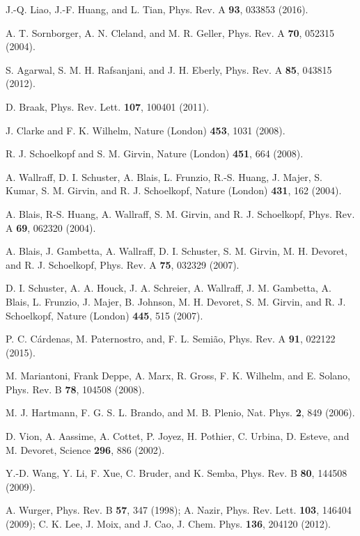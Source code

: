 \documentclass[%
reprint,
amsmath,amssymb,
aps,
pra,
]{revtex4-1}
\begin{document}
\begin{thebibliography}{99}
 J.-Q. Liao, J.-F. Huang, and L. Tian, Phys. Rev. A \textbf{93}, 033853 (2016).

 A. T. Sornborger, A. N. Cleland, and M. R. Geller, Phys. Rev. A \textbf{70}, 052315 (2004).

 S. Agarwal, S. M. H. Rafsanjani, and J. H. Eberly, Phys. Rev. A \textbf{85}, 043815 (2012).

 D. Braak, Phys. Rev. Lett. \textbf{107}, 100401 (2011).

 J. Clarke and F. K. Wilhelm, Nature (London) \textbf{453}, 1031 (2008).

 R. J. Schoelkopf and S. M. Girvin, Nature (London) \textbf{451}, 664 (2008).

 A. Wallraff, D. I. Schuster, A. Blais, L. Frunzio, R.-S. Huang, J. Majer, S. Kumar, S. M. Girvin, and R. J. Schoelkopf, Nature (London) \textbf{431}, 162 (2004).

 A. Blais, R-S. Huang, A. Wallraff, S. M. Girvin, and R. J. Schoelkopf, Phys. Rev. A \textbf{69}, 062320 (2004).

 A. Blais, J. Gambetta, A. Wallraff, D. I. Schuster, S. M. Girvin, M. H. Devoret, and R. J. Schoelkopf, Phys. Rev. A \textbf{75}, 032329 (2007).

 D. I. Schuster, A. A. Houck, J. A. Schreier, A. Wallraff, J. M. Gambetta, A. Blais, L. Frunzio, J. Majer, B. Johnson, M. H. Devoret, S. M. Girvin, and R. J. Schoelkopf, Nature (London) \textbf{445}, 515 (2007).

 P. C. C\'ardenas, M. Paternostro, and, F. L. Semi\~ao, Phys. Rev. A \textbf{91}, 022122 (2015). 

 M. Mariantoni, Frank Deppe, A. Marx, R. Gross, F. K. Wilhelm, and E. Solano, Phys. Rev. B \textbf{78}, 104508 (2008).

 M. J. Hartmann, F. G. S. L. Brando, and M. B. Plenio, Nat. Phys. \textbf{2}, 849 (2006).

 D. Vion, A. Aassime, A. Cottet, P. Joyez, H. Pothier, C. Urbina,
D. Esteve, and M. Devoret, Science \textbf{296}, 886 (2002).

 Y.-D. Wang, Y. Li, F. Xue, C. Bruder, and K. Semba, Phys. Rev.
B \textbf{80}, 144508 (2009).

 A. Wurger, Phys. Rev. B \textbf{57}, 347 (1998); A. Nazir, Phys. Rev. Lett. \textbf{103}, 146404 (2009); C. K. Lee, J. Moix, and J. Cao, J. Chem. Phys. \textbf{136}, 204120 (2012).


\end{thebibliography}
\end{document}
